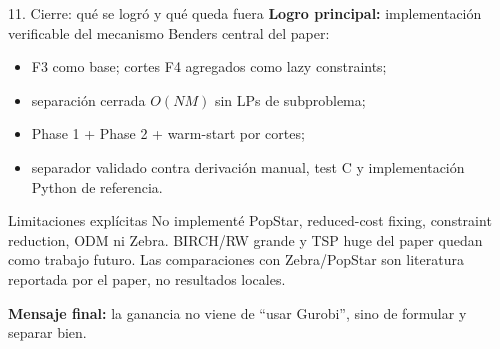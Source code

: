 \documentclass[10pt,aspectratio=169]{beamer}
\begin{document}
\begin{frame}{11. Cierre: qué se logró y qué queda fuera}
\textbf{Logro principal:} implementación verificable del mecanismo Benders central del paper:
\begin{itemize}
  \item F3 como base; cortes F4 agregados como lazy constraints;
  \item separación cerrada $O(NM)$ sin LPs de subproblema;
  \item Phase 1 + Phase 2 + warm-start por cortes;
  \item separador validado contra derivación manual, test C y implementación Python de referencia.
\end{itemize}
\begin{block}{Limitaciones explícitas}
No implementé PopStar, reduced-cost fixing, constraint reduction, ODM ni Zebra. BIRCH/RW grande y TSP huge del paper quedan como trabajo futuro. Las comparaciones con Zebra/PopStar son literatura reportada por el paper, no resultados locales.
\end{block}
\vfill
\centering
\textbf{Mensaje final:} la ganancia no viene de “usar Gurobi”, sino de formular y separar bien.
\end{frame}
\end{document}
